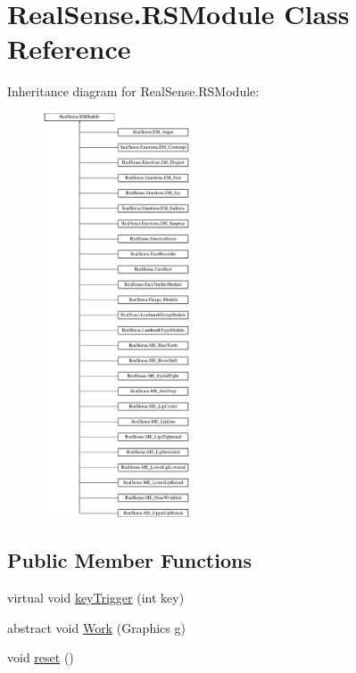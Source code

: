 \hypertarget{class_real_sense_1_1_r_s_module}{}\section{Real\+Sense.\+R\+S\+Module Class Reference}
\label{class_real_sense_1_1_r_s_module}
Inheritance diagram for Real\+Sense.\+R\+S\+Module\+:\begin{figure}[H]
\begin{center}
\leavevmode
\includegraphics[height=12.000000cm]{class_real_sense_1_1_r_s_module}
\end{center}
\end{figure}
\subsection*{Public Member Functions}
\begin{DoxyCompactItemize}
\item 
virtual void \hyperlink{class_real_sense_1_1_r_s_module_a72f31ae62486b23d17e1a04c902a21c5}{key\+Trigger} (int key)
\item 
abstract void \hyperlink{class_real_sense_1_1_r_s_module_a2ec830b7932ee7c0077d473f81c73867}{Work} (Graphics g)
\item 
void \hyperlink{class_real_sense_1_1_r_s_module_a8102b36be1a741846ed45f8ec277c577}{reset} ()
\end{DoxyCompactItemize}
